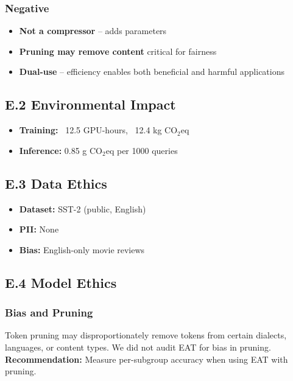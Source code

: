 \subsubsection{Negative}
\begin{itemize}
\item \textbf{Not a compressor} -- adds parameters
\item \textbf{Pruning may remove content} critical for fairness
\item \textbf{Dual-use} -- efficiency enables both beneficial and harmful applications

\end{itemize}
\subsection{E.2 Environmental Impact}

\begin{itemize}
\item \textbf{Training:} ~12.5 GPU-hours, ~12.4 kg CO$_2$eq
\item \textbf{Inference:} 0.85 g CO$_2$eq per 1000 queries

\end{itemize}
\subsection{E.3 Data Ethics}

\begin{itemize}
\item \textbf{Dataset:} SST-2 (public, English)
\item \textbf{PII:} None
\item \textbf{Bias:} English-only movie reviews

\end{itemize}
\subsection{E.4 Model Ethics}

\subsubsection{Bias and Pruning}

Token pruning may disproportionately remove tokens from certain dialects, 
languages, or content types. We did not audit EAT for bias in pruning. 
\textbf{Recommendation:} Measure per-subgroup accuracy when using EAT with 
pruning.

